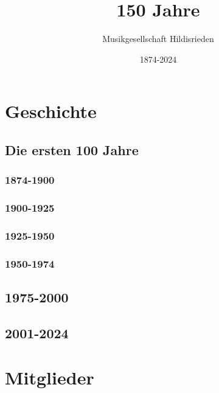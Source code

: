 \documentclass{book}
\title{150 Jahre}
\author{Musikgesellschaft Hildisrieden}
\date{1874-2024}
\begin{document}
\frontmatter
\maketitle
\tableofcontents

\mainmatter

\part{Geschichte}

\chapter{Die ersten 100 Jahre}


\section{1874-1900}




\section{1900-1925}

\clearpage

\section{1925-1950}

\clearpage

\section{1950-1974}




\chapter{1975-2000}


\chapter{2001-2024}



\part{Mitglieder}
\end{document}

